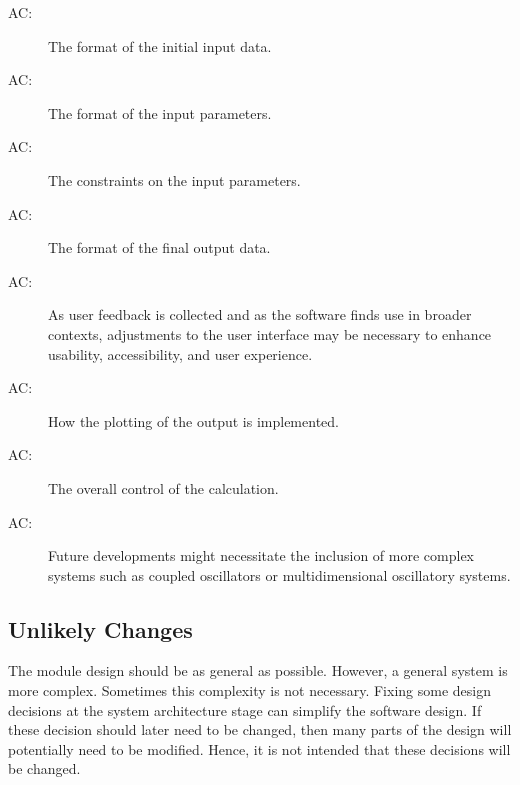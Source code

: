 \documentclass[12pt, titlepage]{article}
\newcounter{acnum}
\newcommand{\actheacnum}{AC\theacnum}
\begin{document}
\begin{description}
\item[ \actheacnum \label{acInitInput}:] The format of the initial input data.
\item[ \actheacnum \label{acInputParams}:]The format of the input parameters.
\item[ \actheacnum \label{acInputConstraints}:] The constraints on the input parameters.
\item[ \actheacnum \label{acFinalOutput}:] The format of the final output data.
\item[ \actheacnum \label{acUserInterface}:] As user feedback is collected and as the software finds use in broader contexts, adjustments to the user interface may be necessary to enhance usability, accessibility, and user experience.
\item[ \actheacnum \label{acOutputPlot}:] How the plotting of the output is implemented.
\item[ \actheacnum \label{acCalcControl}:] The overall control of the calculation.
\item[ \actheacnum \label{acFutureDev}:] Future developments might necessitate the inclusion of more complex systems such as coupled oscillators or multidimensional oscillatory systems.
\end{description}

\subsection{Unlikely Changes} \label{SecUchange}

The module design should be as general as possible. However, a general system is
more complex. Sometimes this complexity is not necessary. Fixing some design
decisions at the system architecture stage can simplify the software design. If
these decision should later need to be changed, then many parts of the design
will potentially need to be modified. Hence, it is not intended that these
decisions will be changed.
\end{document}
